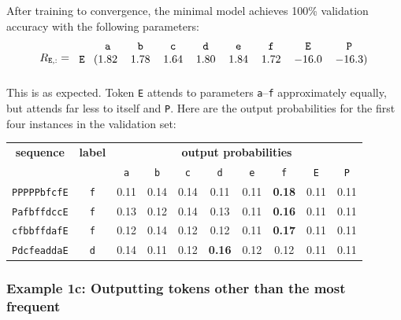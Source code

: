 \documentclass{article}
\newcommand{\ta}{\mathtt{a}}
\newcommand{\tb}{\mathtt{b}}
\newcommand{\tc}{\mathtt{c}}
\newcommand{\td}{\mathtt{d}}
\newcommand{\te}{\mathtt{e}}
\newcommand{\tf}{\mathtt{f}}
\newcommand{\tE}{\mathtt{E}}
\newcommand{\tP}{\mathtt{P}}
\begin{document}
After training to convergence, the minimal model achieves 100\%
validation accuracy with the following parameters:
\begin{displaymath}
  R_{\tE,:} =
  \begin{blockarray}{ccccccccc}
       & \ta & \tb & \tc & \td & \te & \tf & \tE & \tP  \\
      \begin{block}{r(cccccccc)}
        \tE & 1.82 &  1.78 &  1.64 &  1.80 &  1.84 &   1.72 & -16.0 & -16.3 \\
      \end{block}
    \end{blockarray} \\
\end{displaymath}
This is as expected. Token \texttt{E} attends to parameters
\texttt{a}--\texttt{f} approximately equally, but attends far less to
itself and \texttt{P}. Here are the output probabilities for the first
four instances in the validation set:
\begin{center}
\begin{tabular}{cccccccccc}
  \textbf{sequence} & \textbf{label} & \multicolumn{8}{c}{\textbf{output probabilities}} \\
  & & \texttt{a} & \texttt{b} & \texttt{c} & \texttt{d} & \texttt{e} & \texttt{f} & \texttt{E} & \texttt{P} \\
\texttt{PPPPPbfcfE} & \texttt{f} & 0.11 & 0.14 & 0.14 & 0.11 & 0.11 & \textbf{0.18} & 0.11 & 0.11 \\
\texttt{PafbffdccE} & \texttt{f} & 0.13 & 0.12 & 0.14 & 0.13 & 0.11 & \textbf{0.16} & 0.11 & 0.11 \\
\texttt{cfbbffdafE} & \texttt{f} & 0.12 & 0.14 & 0.12 & 0.12 & 0.11 & \textbf{0.17} & 0.11 & 0.11 \\
\texttt{PdcfeaddaE} & \texttt{d} & 0.14 & 0.11 & 0.12 & \textbf{0.16} & 0.12 & 0.12 & 0.11 & 0.11 \\
\end{tabular}
\end{center}


\subsubsection*{Example 1c: Outputting tokens other than the most frequent}
\end{document}
